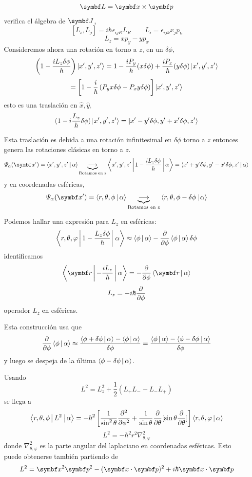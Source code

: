 \documentclass[10pt,oneside]{CBFT_book}
\begin{document}
\[
	\vb{L} = \vb{x} \times \vb{p}
\]
verifica el álgebra de $\vb{J}$,
\[
	[ L_i, L_j ] = i\hbar \epsilon_{ijR} L_R \qquad L_i = \epsilon_{ijk}x_jp_k
\]
\[
	L_z = xp_y - yp_x
\]
Consideremos ahora una rotación en torno a $z$, en un $\delta\phi$,
\[
	\left( 1 - \frac{iL_z\delta\phi}{\hbar} \right) \Ket{x',y',z'} =
	1 - \frac{iP_y}{\hbar}(x\delta\phi) + \frac{iP_x}{\hbar}(y\delta\phi) \Ket{x',y',z'}
\]
\[
	= \left[ 1 - \frac{i}{\hbar}\left( P_y x\delta\phi - P_x y\delta\phi \right)\right] \Ket{x',y',z'}
\]
esto es una traslación en $\hat{x},\hat{y}$,
\[
	(1-i\frac{L_z}{\hbar}\delta\phi) \Ket{x',y',z'} = \Ket{x'-y'\delta\phi,y'+x'\delta\phi,z'}
\]

Esta traslación es debida a una rotación infinitesimal en $\delta\phi$ torno a $z$ entonces genera las 
rotaciones clásicas en torno a $z$.
\[
	\Psi_\alpha(\vb{x}') = \Braket{x',y',z'|\alpha} \underbrace{\longrightarrow}_{\text{Rotamos en z}}
	\Braket{x',y',z'|1-\frac{iL_z\delta\phi}{\hbar}|\alpha} = \Braket{x'+y'\delta\phi,y'-x'\delta\phi,z'|\alpha}
\]
y en coordenadas esféricas,
\[
	\Psi_\alpha(\vb{x}') = \Braket{r,\theta,\phi|\alpha} 
	\underbrace{\longrightarrow}_{\text{Rotamos en z}} \Braket{r,\theta,\phi-\delta\phi|\alpha}
\]

Podemos hallar una expresión para $L_z$ en esféricas:
\[
	\Braket{r,\theta,\varphi|1-\frac{L_z\delta\phi}{\hbar}|\alpha} \approx
	\Braket{\phi|\alpha} -\dpar{}{\phi}\Braket{\phi|\alpha}\delta\phi
\]
identificamos 
\[
	\Braket{\vb{r}|-\frac{iL_z}{\hbar}|\alpha} = -\dpar{}{\phi}\Braket{\vb{r}|\alpha}
\]
\[
	L_z =  -i\hbar\dpar{}{\phi}
\]
operador $L_z$ en esféricas.

Esta construcción usa que 
\[
	\dpar{}{\phi} \Braket{\phi|\alpha} \approx 
	\frac{\Braket{\phi+\delta\phi|\alpha}-\Braket{\phi|\alpha}}{\delta\phi} =
	\frac{\Braket{\phi|\alpha} -\Braket{\phi-\delta\phi|\alpha}}{\delta\phi}
\]
y luego se despeja de la última $\Braket{\phi-\delta\phi|\alpha}$.

Usando 
\[
	L^2 = L_z^2 + \frac{1}{2}\left( L_+L_- + L_-L_+ \right)
\]
se llega a 
\[
	\Braket{r,\theta,\phi|L^2|\alpha} = -\hbar^2\left[ \frac{1}{\sin^2 \theta}\dpar[2]{}{\phi} +
	\frac{1}{\sin \theta} \dpar{}{\theta}[\sin\theta\dpar{}{\theta} ]\right]
	\Braket{r,\theta,\varphi|\alpha}
\]
\[
	L^2 = -\hbar^2 r^2 \nabla^2_{\theta,\varphi}
\]
donde $\nabla^2_{\theta,\varphi}$ es la parte angular del laplaciano en coordenadas esféricas.
Esto puede obtenerse también partiendo de 
\[
	L^2 = \vb{x}^2\vb{p}^2 - (\vb{x}\cdot\vb{p})^2 + i\hbar \vb{x}\cdot\vb{p}
\]
\end{document}
